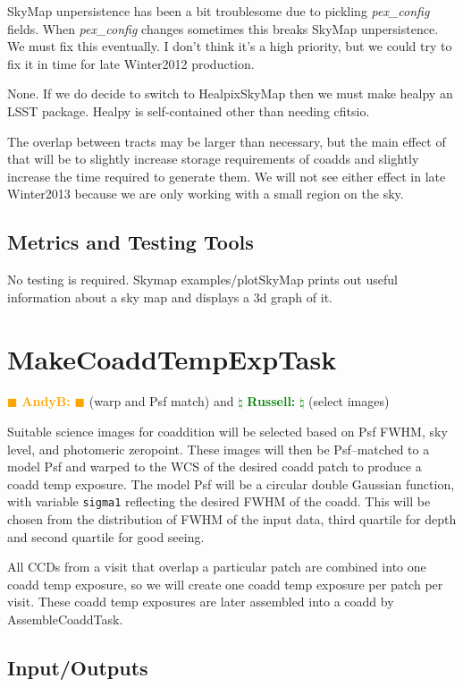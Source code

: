 \documentclass[12pt]{article}
\newcommand{\becker} { \textcolor{orange} {
\ensuremath{\blacksquare} {\bf AndyB:}  
\ensuremath{\blacksquare} } }
\newcommand{\russ} { \textcolor{green} {
\ensuremath{\natural} {\bf Russell:}  
\ensuremath{\natural} } }
\begin{document}
SkyMap unpersistence has been a bit troublesome due to pickling {\it pex\_config} fields.
When {\it pex\_config} changes sometimes this breaks SkyMap unpersistence. We must fix this eventually.
I don't think it's a high priority, but we could try to fix it in time for late Winter2012 production.

None. If we do decide to switch to HealpixSkyMap then we must make healpy an LSST package.
Healpy is self-contained other than needing cfitsio.

The overlap between tracts may be larger than necessary, but the main effect of that
will be to slightly increase storage requirements of coadds and slightly increase
the time required to generate them. We will not see either effect in late Winter2013
because we are only working with a small region on the sky.

\subsection{Metrics and Testing Tools}

No testing is required.  Skymap examples/plotSkyMap prints out useful
information about a sky map and displays a 3d graph of it.


\clearpage 
\section{MakeCoaddTempExpTask} \becker (warp and Psf match) and \russ (select images)

Suitable science images for coaddition will be selected based on Psf FWHM, 
sky level, and photomeric zeropoint.  These images will then be Psf--matched to a model Psf and warped
to the WCS of the desired coadd patch to produce a coadd temp exposure.
The model Psf will be a circular double Gaussian
function, with variable {\tt sigma1} reflecting the desired FWHM of the coadd.  This will
be chosen from the distribution of FWHM of the input data, third quartile for depth and second
quartile for good seeing.

All CCDs from a visit that overlap a particular patch are combined into one coadd temp exposure,
so we will create one coadd temp exposure per patch per visit.
These coadd temp exposures are later assembled into a coadd by AssembleCoaddTask.

\subsection{Input/Outputs}
\end{document}
